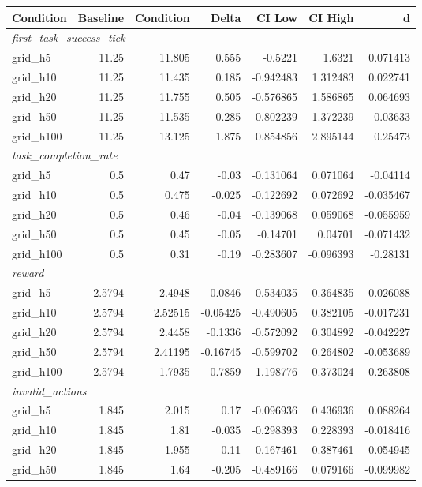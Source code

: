 \begin{tabular}{lrrrrrr}
\toprule
Condition & Baseline & Condition & Delta & CI Low & CI High & d \\
\midrule
  \multicolumn{7}{l}{\textit{first_task_success_tick}} \\
  grid_h5 & 11.25 & 11.805 & 0.555 & -0.5221 & 1.6321 & 0.071413 \\
  grid_h10 & 11.25 & 11.435 & 0.185 & -0.942483 & 1.312483 & 0.022741 \\
  grid_h20 & 11.25 & 11.755 & 0.505 & -0.576865 & 1.586865 & 0.064693 \\
  grid_h50 & 11.25 & 11.535 & 0.285 & -0.802239 & 1.372239 & 0.03633 \\
  grid_h100 & 11.25 & 13.125 & 1.875 & 0.854856 & 2.895144 & 0.25473 \\
  \multicolumn{7}{l}{\textit{task_completion_rate}} \\
  grid_h5 & 0.5 & 0.47 & -0.03 & -0.131064 & 0.071064 & -0.04114 \\
  grid_h10 & 0.5 & 0.475 & -0.025 & -0.122692 & 0.072692 & -0.035467 \\
  grid_h20 & 0.5 & 0.46 & -0.04 & -0.139068 & 0.059068 & -0.055959 \\
  grid_h50 & 0.5 & 0.45 & -0.05 & -0.14701 & 0.04701 & -0.071432 \\
  grid_h100 & 0.5 & 0.31 & -0.19 & -0.283607 & -0.096393 & -0.28131 \\
  \multicolumn{7}{l}{\textit{reward}} \\
  grid_h5 & 2.5794 & 2.4948 & -0.0846 & -0.534035 & 0.364835 & -0.026088 \\
  grid_h10 & 2.5794 & 2.52515 & -0.05425 & -0.490605 & 0.382105 & -0.017231 \\
  grid_h20 & 2.5794 & 2.4458 & -0.1336 & -0.572092 & 0.304892 & -0.042227 \\
  grid_h50 & 2.5794 & 2.41195 & -0.16745 & -0.599702 & 0.264802 & -0.053689 \\
  grid_h100 & 2.5794 & 1.7935 & -0.7859 & -1.198776 & -0.373024 & -0.263808 \\
  \multicolumn{7}{l}{\textit{invalid_actions}} \\
  grid_h5 & 1.845 & 2.015 & 0.17 & -0.096936 & 0.436936 & 0.088264 \\
  grid_h10 & 1.845 & 1.81 & -0.035 & -0.298393 & 0.228393 & -0.018416 \\
  grid_h20 & 1.845 & 1.955 & 0.11 & -0.167461 & 0.387461 & 0.054945 \\
  grid_h50 & 1.845 & 1.64 & -0.205 & -0.489166 & 0.079166 & -0.099982 \\

\end{tabular}
